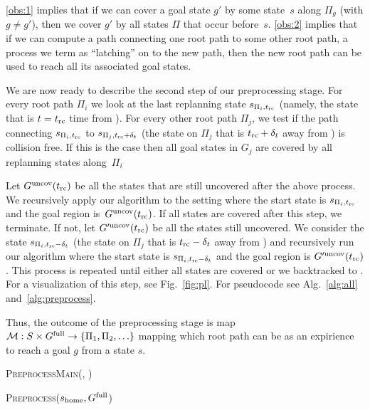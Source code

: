 \documentclass[conference]{IEEEtran}
\begin{document}
%
\ref{obs:1} implies that if we can cover a goal state $g'$  by some state~$s$ along $\Pi_g$ (with $g \neq g'$), then we cover $g'$ by all states $\Pi$ that occur before~$s$.
%
\ref{obs:2} implies that if we can compute a path connecting one root path to some other root path, a process we term as ``latching'' on to the new path, then the new root path can be used to reach all its associated goal states.

We are now ready to describe the second step of our preprocessing stage.
%
For every root path $\Pi_i$ we look at the last replanning state $s_{\Pi_i, t_{\textrm{rc}}}$ (namely, the state that is $t=t_{\textrm{rc}}$ time from \Shome). For every other root path $\Pi_j$, we test if the path connecting $s_{\Pi_i, t_{\textrm{rc}}}$ to $s_{\Pi_j, t_{\textrm{rc}} + \delta_t}$ (the state on $\Pi_j$ that is $t_{\textrm{rc}}+\delta_t$ away from \Shome) is collision free. 
%
If this is the case then all goal states in $G_j$ are covered by all replanning states along~$\Pi_i$
%

Let $G^{\textrm{uncov}}(t_{\textrm{rc}})$ be all the states that are still uncovered after the above process. We recursively apply our algorithm to the setting where the start state is $s_{\Pi_i, t_{\textrm{rc}}}$ and the goal region is~$G^{\textrm{uncov}}(t_{\textrm{rc}})$.
If all states are covered after this step, we terminate. 
If not, let $G'^{\textrm{uncov}}(t_{\textrm{rc}})$ be all the states still uncovered.
We consider the state $s_{\Pi_i, t_{\textrm{rc}}-\delta_t}$ (the state on $\Pi_j$ that is $t_{\textrm{rc}}-\delta_t$ away from \Shome) and recursively run our algorithm where the start state is $s_{\Pi_i, t_{\textrm{rc}}-\delta_t}$ and the goal region is $G'^{\textrm{uncov}}(t_{\textrm{rc}})$.
This process is repeated until either all states are covered or we backtracked to \Shome.
For a visualization of this step, see Fig.~\ref{fig:pl}.
For pseudocode see Alg.~\ref{alg:all} and~\ref{alg:preprocess}.

Thus, the outcome of the preprocessing stage is map $\mathcal{M}: S \times G^{\textrm{full}} \rightarrow \{ \Pi_1, \Pi_2, \ldots \}$ mapping which root path can be as an expirience to reach a goal $g$ from a state $s$.

\begin{algorithm}[t]
\caption{\textsc{PreprocessMain(\Shome, \Gfull)}}\label{alg:all}
\begin{algorithmic}[1]
    \State \textsc{Preprocess}($s_{\textrm{home}}, G^{\textrm{full}}$)
\end{algorithmic}
\end{algorithm}
\end{document}

